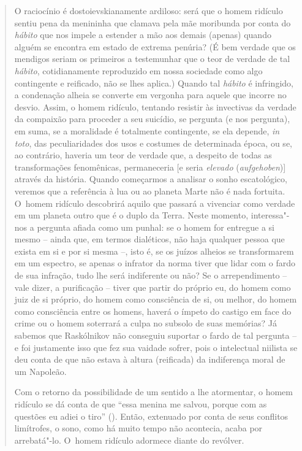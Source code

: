 {\begin{quote}
O raciocínio é dostoievskianamente ardiloso: será que o homem ridículo
sentiu pena da menininha que clamava pela mãe moribunda por conta do
\emph{hábito} que nos impele a estender a mão aos demais (apenas) quando
alguém se encontra em estado de extrema penúria? (É bem verdade que os
mendigos seriam os primeiros a testemunhar que o teor de verdade de tal
\emph{hábito}, cotidianamente reproduzido em nossa sociedade como algo
contingente e reificado, não se lhes aplica.) Quando tal \emph{hábito} é
infringido, a condenação alheia se converte em vergonha para aquele que
incorre no desvio. Assim, o homem ridículo, tentando resistir às
invectivas da verdade da compaixão para proceder a seu suicídio, se
pergunta (e nos pergunta), em suma, se a moralidade é totalmente
contingente, se ela depende, \emph{in toto}, das peculiaridades dos usos
e costumes de determinada época, ou se, ao contrário, haveria um teor de
verdade que, a despeito de todas as transformações fenomênicas,
permaneceria {[}e seria \emph{elevado} (\emph{aufgehoben}){]} através da
história. Quando começarmos a analisar o sonho escatológico, veremos que
a referência à lua ou ao planeta Marte não é nada fortuita. O~homem
ridículo descobrirá aquilo que passará a vivenciar como verdade em um
planeta outro que é o duplo da Terra. Neste momento, interessa"-nos a
pergunta afiada como um punhal: se o homem for entregue a si mesmo --
ainda que, em termos dialéticos, não haja qualquer pessoa que exista em
si e por si mesma --, isto é, se os juízos alheios se transformarem em
um espectro, se apenas o infrator da norma tiver que lidar com o fardo
de sua infração, tudo lhe será indiferente ou não? Se o arrependimento
-- vale dizer, a purificação -- tiver que partir do próprio eu, do homem
como juiz de si próprio, do homem como consciência de si, ou melhor, do
homem como consciência entre os homens, haverá o ímpeto do castigo em
face do crime ou o homem soterrará a culpa no subsolo de suas memórias?
Já sabemos que Raskólnikov não conseguiu suportar o fardo de tal
pergunta -- e foi justamente isso que fez sua vaidade sofrer, pois o
intelectual niilista se deu conta de que não estava à altura (reificada)
da indiferença moral de um Napoleão.

Com o retorno da possibilidade de um sentido a lhe atormentar, o homem
ridículo se dá conta de que ``essa menina me salvou, porque com as
questões eu adiei o tiro'' (). Então, extenuado por conta de seus
conflitos limítrofes, o sono, como há muito tempo não acontecia, acaba
por arrebatá"-lo. O~homem ridículo adormece diante do revólver.


\end{quote}}
